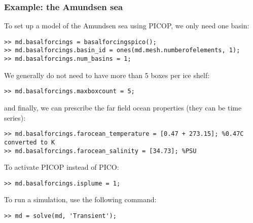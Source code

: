 \subsubsection{Example: the Amundsen sea}
To set up a model of the Amundsen sea using PICOP, we only need one basin:
\begin{lstlisting}
>> md.basalforcings = basalforcingspico();
>> md.basalforcings.basin_id = ones(md.mesh.numberofelements, 1);
>> md.basalforcings.num_basins = 1;
\end{lstlisting}
We generally do not need to have more than 5 boxes per ice shelf:
\begin{lstlisting}
>> md.basalforcings.maxboxcount = 5;
\end{lstlisting}
and finally, we can prescribe the far field ocean properties (they can be time series):
\begin{lstlisting}
>> md.basalforcings.farocean_temperature = [0.47 + 273.15]; %0.47C converted to K
>> md.basalforcings.farocean_salinity = [34.73]; %PSU
\end{lstlisting}
To activate PICOP instead of PICO:
\begin{lstlisting}
>> md.basalforcings.isplume = 1;
\end{lstlisting}
To run a simulation, use the following command:
\begin{lstlisting}
>> md = solve(md, 'Transient');
\end{lstlisting}

\clearpage %
